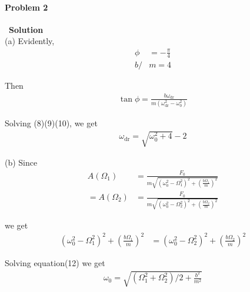 \documentclass[12pt,a4paper]{article}
\begin{document}
\paragraph{\large \textbf{Problem 2}}~{\textbf{Solution}}
\vspace{2mm}\\
\noindent (a) Evidently, 
\begin{align}
	\phi &= -\frac{\pi}{4}\\
	b/&m = 4
\end{align}
\par Then
\begin{align}
	\tan \phi = \frac{b\omega_{\text{dr}}}{m(\omega_{\text{dr}}^2-\omega_0^2)}
\end{align}
\par Solving (8)(9)(10), we get
\begin{align}
	\omega_{\text{dr}} = \sqrt{\omega_0^2 + 4} - 2
\end{align}

\noindent (b) Since
\begin{align*}
	A(\Omega_1) &= \frac{F_0}{m\sqrt{(\omega_0^2 - \Omega_1^2)^2 + \left( \frac{b\Omega_1}{m} \right)^2}}\\
	= A(\Omega_2) &= \frac{F_0}{m\sqrt{(\omega_0^2 - \Omega_2^2)^2 + \left( \frac{b\Omega_2}{m} \right)^2}}
\end{align*}
\par we get
\begin{align}
	(\omega_0^2 - \Omega_1^2)^2 + \left( \frac{b\Omega_1}{m} \right)^2 &=(\omega_0^2 - \Omega_2^2)^2 + \left( \frac{b\Omega_2}{m} \right)^2
\end{align}
\par Solving equation(12) we get
\begin{align}
	\omega_0 = \sqrt{(\Omega_1^2 + \Omega_2^2)/2 + \frac{b^2}{m^2}}
\end{align}
\end{document}
